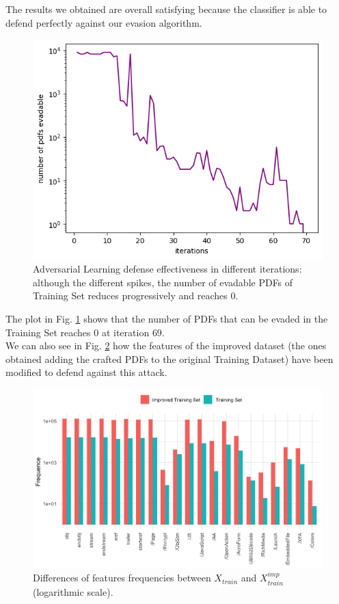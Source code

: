 \documentclass[twocolumn, switch]{article} %
\newcommand\x{0.7}
\begin{document}
The results we obtained are overall satisfying because the classifier is able to defend perfectly against our evasion algorithm.
\vspace{3mm}
\begin{figure}[ht!]
	\centering
	\includegraphics[width=\x\linewidth]{adv_learning.png}
	\caption{Adversarial Learning defense effectiveness in different iterations: although the different spikes, the number of evadable PDFs of Training Set reduces progressively and reaches $0$.}
	\label{fig:advlearn}
	\vspace{2mm}
\end{figure}
The plot in Fig. \ref{fig:advlearn} shows that the number of PDFs that can be evaded in the Training Set reaches $0$ at iteration $69$.\\
We can also see in Fig. \ref{fig:improved} how the features of the improved dataset (the ones obtained adding the crafted PDFs to the original Training Dataset) have been modified to defend against this attack.

\begin{figure}[ht!]
	\centering
	\includegraphics[width=\x\linewidth]{hist_train_improved.png}
	\caption{Differences of features frequencies between $X_{train}$ and $X_{train}^{imp}$ (logarithmic scale).}
	\label{fig:improved}
	\vspace{5mm}
\end{figure}
\end{document}
